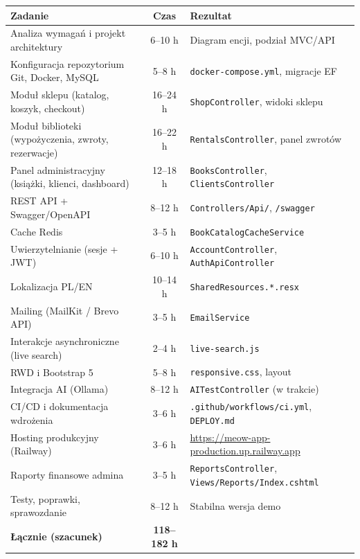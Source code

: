 \documentclass[12pt,a4paper]{article}
\begin{document}
\begin{longtable}{@{}p{}cp{}@{}}
\toprule
\textbf{Zadanie} & \textbf{Czas} & \textbf{Rezultat} \\
\midrule
\endhead
Analiza wymagań i projekt architektury & 6--10 h &
    Diagram encji, podział MVC/API \\
\addlinespace
Konfiguracja repozytorium Git, Docker, MySQL & 5--8 h &
    \texttt{docker-compose.yml}, migracje EF \\
\addlinespace
Moduł sklepu (katalog, koszyk, checkout) & 16--24 h &
    \texttt{ShopController}, widoki sklepu \\
\addlinespace
Moduł biblioteki (wypożyczenia, zwroty, rezerwacje) & 16--22 h &
    \texttt{RentalsController}, panel zwrotów \\
\addlinespace
Panel administracyjny (książki, klienci, dashboard) & 12--18 h &
    \texttt{BooksController}, \texttt{ClientsController} \\
\addlinespace
REST API + Swagger/OpenAPI & 8--12 h &
    \texttt{Controllers/Api/}, \texttt{/swagger} \\
\addlinespace
Cache Redis & 3--5 h &
    \texttt{BookCatalogCacheService} \\
\addlinespace
Uwierzytelnianie (sesje + JWT) & 6--10 h &
    \texttt{AccountController}, \texttt{AuthApiController} \\
\addlinespace
Lokalizacja PL/EN & 10--14 h &
    \texttt{SharedResources.*.resx} \\
\addlinespace
Mailing (MailKit / Brevo API) & 3--5 h &
    \texttt{EmailService} \\
\addlinespace
Interakcje asynchroniczne (live search) & 2--4 h &
    \texttt{live-search.js} \\
\addlinespace
RWD i Bootstrap 5 & 5--8 h &
    \texttt{responsive.css}, layout \\
\addlinespace
Integracja AI (Ollama) & 8--12 h &
    \texttt{AITestController} (w trakcie) \\
\addlinespace
CI/CD i dokumentacja wdrożenia & 3--6 h &
    \texttt{.github/workflows/ci.yml}, \texttt{DEPLOY.md} \\
\addlinespace
Hosting produkcyjny (Railway) & 3--6 h &
    \url{https://meow-app-production.up.railway.app} \\
\addlinespace
Raporty finansowe admina & 3--5 h &
    \texttt{ReportsController}, \texttt{Views/Reports/Index.cshtml} \\
\addlinespace
Testy, poprawki, sprawozdanie & 8--12 h &
    Stabilna wersja demo \\
\midrule
\textbf{Łącznie (szacunek)} & \textbf{118--182 h} & \\
\bottomrule
\end{longtable}
\end{document}
